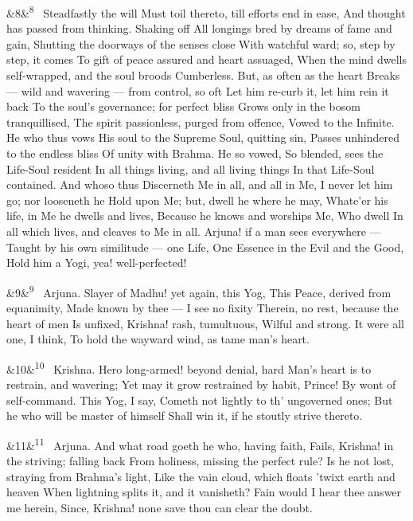 \documentclass[12pt]{article}
\newcommand{\para}[1][]{\par\noindent\ifx&#1&\else\textsuperscript{\footnotesize #1}~\fi}
\begin{document}
\para[8] Steadfastly the will Must toil thereto, till efforts end in ease, And thought has passed from thinking. Shaking off All longings bred by dreams of fame and gain, Shutting the doorways of the senses close With watchful ward; so, step by step, it comes To gift of peace assured and heart assuaged, When the mind dwells self-wrapped, and the soul broods Cumberless. But, as often as the heart Breaks --- wild and wavering --- from control, so oft Let him re-curb it, let him rein it back To the soul's governance; for perfect bliss Grows only in the bosom tranquillised, The spirit passionless, purged from offence, Vowed to the Infinite. He who thus vows His soul to the Supreme Soul, quitting sin, Passes unhindered to the endless bliss Of unity with Brahma. He so vowed, So blended, sees the Life-Soul resident In all things living, and all living things In that Life-Soul contained. And whoso thus Discerneth Me in all, and all in Me, I never let him go; nor looseneth he Hold upon Me; but, dwell he where he may, Whate'er his life, in Me he dwells and lives, Because he knows and worships Me, Who dwell In all which lives, and cleaves to Me in all. Arjuna! if a man sees everywhere --- Taught by his own similitude --- one Life, One Essence in the Evil and the Good, Hold him a Yogi, yea! well-perfected!

\para[9] Arjuna. Slayer of Madhu! yet again, this Yog, This Peace, derived from equanimity, Made known by thee --- I see no fixity Therein, no rest, because the heart of men Is unfixed, Krishna! rash, tumultuous, Wilful and strong. It were all one, I think, To hold the wayward wind, as tame man's heart.

\para[10] Krishna. Hero long-armed! beyond denial, hard Man's heart is to restrain, and wavering; Yet may it grow restrained by habit, Prince! By wont of self-command. This Yog, I say, Cometh not lightly to th' ungoverned ones; But he who will be master of himself Shall win it, if he stoutly strive thereto.

\para[11] Arjuna. And what road goeth he who, having faith, Fails, Krishna! in the striving; falling back From holiness, missing the perfect rule? Is he not lost, straying from Brahma's light, Like the vain cloud, which floats 'twixt earth and heaven When lightning splits it, and it vanisheth? Fain would I hear thee answer me herein, Since, Krishna! none save thou can clear the doubt.
\end{document}
